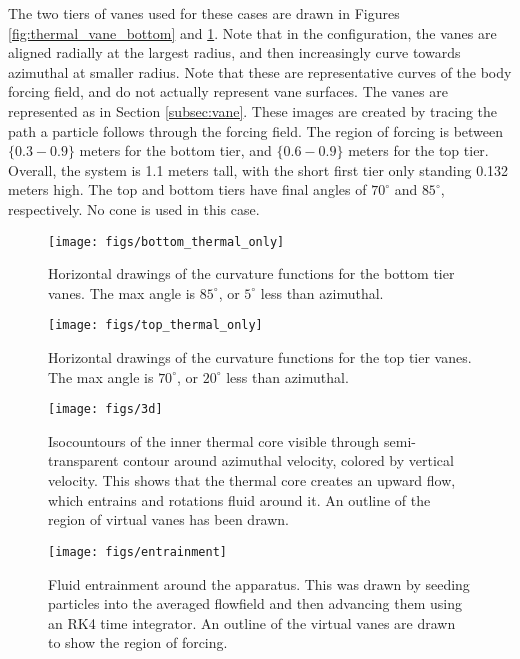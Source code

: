 The two tiers of vanes used for these cases are drawn in Figures
\ref{fig:thermal_vane_bottom} and \ref{fig:thermal_vane_top}.
 Note that in the
configuration, the vanes are 
aligned radially at the largest radius, and then increasingly curve
towards azimuthal at smaller radius. Note that these are representative
curves of the body forcing field, and do not actually represent vane
surfaces. The vanes are represented as in Section \ref{subsec:vane}. 
These images are created by tracing the path a particle follows through
the forcing field. The region of forcing is between $\{0.3-0.9\}$ meters
for the bottom tier, and $\{0.6-0.9\}$ meters for the top tier. Overall,
the system is 1.1 meters tall, with the short first tier only standing
0.132 meters high. The top and bottom tiers have final angles of
$70^{\circ}$ and $85^{\circ}$, respectively. No cone is used in this
case. 

\begin{figure}[htb]
\centering
\begin{minipage}{0.45\textwidth}
\centering
 \texttt{[image: figs/bottom\_thermal\_only]}
 \caption{Horizontal drawings of the curvature functions for the bottom tier
 vanes. The max angle is $85^{\circ}$, or $5^{\circ}$ less than azimuthal.}
 \label{fig:thermal_vane_bottom}  
\end{minipage}\hfill
\begin{minipage}{0.45\textwidth}
\centering
\texttt{[image: figs/top\_thermal\_only]}
\caption{Horizontal drawings of the curvature functions for the top tier
 vanes. The max angle is $70^{\circ}$, or $20^{\circ}$ less than
 azimuthal.} 
 \label{fig:thermal_vane_top}  
\end{minipage}
\end{figure}

\begin{figure}[htb]
\centering
\begin{minipage}{0.45\textwidth}
\centering
 \texttt{[image: figs/3d]}
 \caption{Isocountours of the inner thermal core
  visible through semi-transparent contour around azimuthal velocity,
  colored by vertical velocity. This shows that the thermal core creates
 an upward flow, which entrains and rotations fluid around it. An
 outline of the region of virtual vanes has been drawn.}
 \label{fig:thermal}  
\end{minipage}\hfill
\begin{minipage}{0.45\textwidth}
\centering
\texttt{[image: figs/entrainment]}
\caption{Fluid entrainment around the apparatus. This was drawn by
 seeding particles into the averaged flowfield and then advancing them
 using an RK4 time integrator. An outline of the
  virtual vanes are drawn to show the region of forcing.}
 \label{fig:entrain}  
\end{minipage}
\end{figure}


